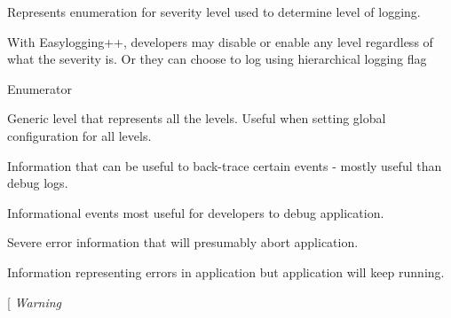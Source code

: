 Represents enumeration for severity level used to determine level of logging. 

With Easylogging++, developers may disable or enable any level regardless of what the severity is. Or they can choose to log using hierarchical logging flag \begin{Desc}
\item[Enumerator]\par
\begin{description}
\item[{\em 
\hypertarget{namespaceel_ab0ac6091262344c52dd2d3ad099e8e36a4cc6684df7b4a92b1dec6fce3264fac8}{Global}\label{namespaceel_ab0ac6091262344c52dd2d3ad099e8e36a4cc6684df7b4a92b1dec6fce3264fac8}
}]Generic level that represents all the levels. Useful when setting global configuration for all levels. \item[{\em 
\hypertarget{namespaceel_ab0ac6091262344c52dd2d3ad099e8e36add4ec0ac4e58f7c32a01244ae91150b1}{Trace}\label{namespaceel_ab0ac6091262344c52dd2d3ad099e8e36add4ec0ac4e58f7c32a01244ae91150b1}
}]Information that can be useful to back-\/trace certain events -\/ mostly useful than debug logs. \item[{\em 
\hypertarget{namespaceel_ab0ac6091262344c52dd2d3ad099e8e36aa603905470e2a5b8c13e96b579ef0dba}{Debug}\label{namespaceel_ab0ac6091262344c52dd2d3ad099e8e36aa603905470e2a5b8c13e96b579ef0dba}
}]Informational events most useful for developers to debug application. \item[{\em 
\hypertarget{namespaceel_ab0ac6091262344c52dd2d3ad099e8e36a882384ec38ce8d9582b57e70861730e4}{Fatal}\label{namespaceel_ab0ac6091262344c52dd2d3ad099e8e36a882384ec38ce8d9582b57e70861730e4}
}]Severe error information that will presumably abort application. \item[{\em 
\hypertarget{namespaceel_ab0ac6091262344c52dd2d3ad099e8e36a902b0d55fddef6f8d651fe1035b7d4bd}{Error}\label{namespaceel_ab0ac6091262344c52dd2d3ad099e8e36a902b0d55fddef6f8d651fe1035b7d4bd}
}]Information representing errors in application but application will keep running. \item[{\em 
\hypertarget{namespaceel_ab0ac6091262344c52dd2d3ad099e8e36a0eaadb4fcb48a0a0ed7bc9868be9fbaa}{Warning}\label{namespaceel_ab0ac6091262344c52dd2d3ad099e8e36a0eaadb4fcb48a0a0ed7bc9868be9fbaa}
}
\end{description}
\end{Desc}
